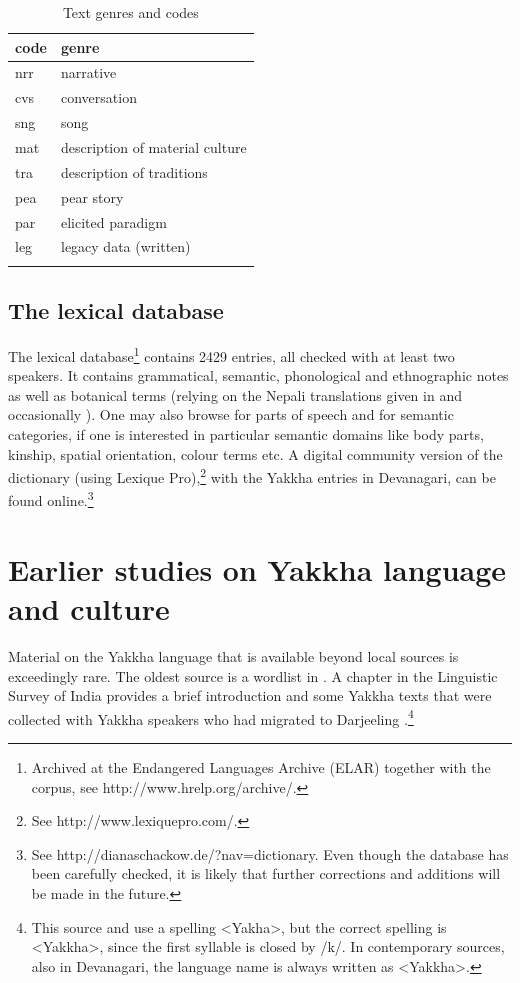 \begin{table}[htp]
\begin{center}
\begin{tabular}{ll}
\lsptoprule
{\sc code}&{\sc genre}\\
\midrule
nrr & narrative \\
cvs & conversation \\
sng & song\\
mat & description of material culture\\
tra & description of traditions\\
pea & pear story\\
par & elicited paradigm\\
leg & legacy data (written)\\
\lspbottomrule
\end{tabular}
\caption{Text genres and codes}\label{tab-genre}
\end{center}
\end{table}


\subsection{The lexical database}

The lexical database\footnote{Archived at the Endangered Languages Archive (ELAR) together with the corpus, see http://www.hrelp.org/archive/.} contains 2429 entries, all checked with at least two speakers. It contains grammatical, semantic, phonological and ethnographic notes as well as botanical terms (relying on the Nepali translations given in \citet{Manandhar2002_Plants} and occasionally \cite{Turner1931A-Comparative}). One may also browse for parts of speech and for semantic categories, if one is interested in particular semantic domains like body parts, kinship, spatial orientation, colour terms etc. A digital community version of the dictionary (using Lexique Pro),\footnote{See http://www.lexiquepro.com/.} with the Yakkha entries in Devanagari, can be found online.\footnote{See http://dianaschackow.de/?nav=dictionary. Even though the database has been carefully checked, it is likely that further corrections and additions will be made in the future.}


\section{Earlier studies on Yakkha language and culture}\label{earlier-work}


Material on the Yakkha language that is available beyond local sources is exceedingly rare. The oldest source is a wordlist in \citet{Hodgson1857_Comparative}. A chapter in the Linguistic Survey of India provides a brief introduction and some Yakkha texts that were collected with Yakkha speakers who had migrated to Darjeeling \citep[305-315]{Grierson1909Linguistic}.\footnote{This source and \citet{Russell1992_Yakha} use a spelling <Yakha>, but the correct spelling is <Yakkha>, since the first syllable is closed by /k/. In contemporary sources, also  in Devanagari, the language name is always written as <Yakkha>.} 

